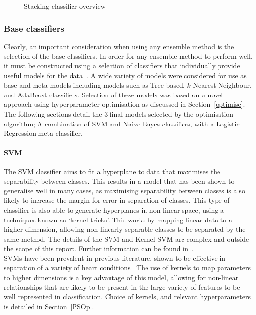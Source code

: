 \documentclass[titlepage, 12pt]{scrartcl} \usepackage{enumitem}
\begin{document}
\begin{figure}[H]
    \caption[caption of stack]{Stacking classifier overview\footnotemark}
    \label{stack}
\end{figure}

\subsubsection{Base classifiers}
Clearly, an important consideration when using any ensemble method is the
selection of the base classifiers. In order for any ensemble method to perform
well, it must be constructed using a selection of classifiers that individually
provide useful models for the data~\parencite[p.484]{Tobergte2013a}.   A wide
variety of models were considered for use as base and meta models including
models such as Tree based, $k$-Nearest Neighbour, and AdaBoost classifiers.
Selection of these models was based on a novel approach using hyperparameter
optimisation as discussed in Section~\ref{optimise}. The following sections
detail the 3 final models selected by the optimisation algorithm; A combination
of SVM and Naive-Bayes classifiers, with a Logistic Regression meta classifier.

\paragraph{SVM}\label{SVM}
The SVM classifier aims to fit a hyperplane to data that maximises the
separability between classes. This results in a model that has been shown to
generalise well in many cases, as maximising separability between classes is
also likely to increase the margin for error in separation of classes. This
type of classifier is also able to generate hyperplanes in non-linear space,
using a techniques known as `kernel tricks'. This works by mapping linear data
to a higher dimension, allowing non-linearly separable classes to be separated
by the same method. The details of the SVM and Kernel-SVM are complex and
outside the scope of this report. Further information can be found
in~\parencite[p.187]{Tobergte2013a}.\\
SVMs have been prevalent in previous literature, shown to be effective in
separation of a variety of heart conditions~\parencite{Ari2010} The use of
kernels to map parameters to higher dimensions is a key advantage of this
model, allowing for non-linear relationships that are likely to be present in
the large variety of features to be well represented in classification. Choice
of kernels, and relevant hyperparameters is detailed in Section~\ref{PSOp}.
\end{document}
